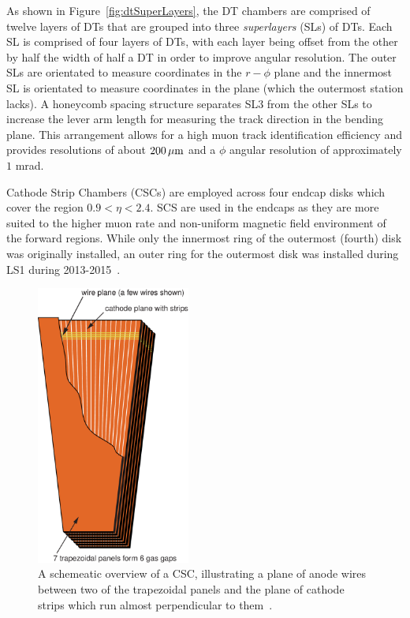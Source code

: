 As shown in Figure~\ref{fig:dtSuperLayers}, the DT chambers are comprised of twelve layers of DTs that are grouped into three \emph{superlayers} (SLs) of DTs.
Each SL is comprised of four layers of DTs, with each layer being offset from the other by half the width of half a DT in order to improve angular resolution.
The outer SLs are orientated to measure coordinates in the $r-\phi$ plane and the innermost SL is orientated to measure coordinates in the \rz plane (which the outermost station lacks).
A honeycomb spacing structure separates SL3 from the other SLs to increase the lever arm length for measuring the track direction in the bending plane.
This arrangement allows for a high muon track identification efficiency and provides resolutions of about $200\,\mu\text{m}$ and a $\phi$ angular resolution of approximately $1$ mrad.

Cathode Strip Chambers (CSCs) are employed across four endcap disks which cover the region $0.9 < \eta < 2.4$.
SCS are used in the endcaps as they are more suited to the higher muon rate and non-uniform magnetic field environment of the forward regions.
While only the innermost ring of the outermost (fourth) disk was originally installed, an outer ring for the outermost disk was installed during LS1 during 2013-2015~\cite{Battilana:2017mrm}.

\begin{figure}[htb]
\begin{center}
\includegraphics[width=0.45\textwidth]{figs/cms/csc_trapezoid_v1.pdf}
\caption{A schemeatic overview of a CSC, illustrating a plane of anode wires between two of the trapezoidal panels and the plane of cathode strips which run almost perpendicular to them~\cite{Bayatian:2006nff}.}
\label{fig:csc}
\end{center}
\end{figure}

